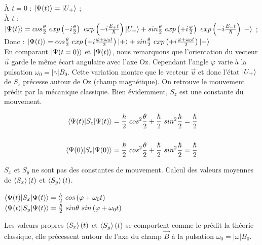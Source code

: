 \documentclass[12pt,a4paper,titlepage]{book}
\begin{document}
À $t=0$ : $\ket{\Psi (t)} = \ket{U_+}$ ;\\

À $t$ : $\ket{\Psi (t)} = cos \frac{\theta}{2} ~exp \left(-i \frac{\theta}{2} \right) ~exp \left(-i \frac{E_+ t}{\hbar} \right) \ket{U_+} + sin \frac{\theta}{2} ~exp \left(+i \frac{\varphi}{2} \right) ~exp \left(-i \frac{E_- t}{\hbar} \right) \ket-$ ;\\

Donc : $\ket{\Psi (t)} = cos \frac{\theta}{2} ~exp \left(+i \frac{\varphi + \omega_0 t}{2} \right) \ket+ + sin \frac{\theta}{2} ~exp \left(+i \frac{\varphi + \omega_0 t}{2} \right) \ket-$\\

En comparant $\ket{\Psi (t=0)}$ et $\ket{\Psi (t)}$, nous remarquons que l'orientation du vecteur $\overrightarrow{u}$ garde le même écart angulaire avec l'axe Oz. Cependant l'angle $\varphi$ varie à la pulsation $\omega_0 = \vert \gamma \vert B_0$. Cette variation montre que le vecteur $\overrightarrow{u}$ et donc l'état $\ket{U_+}$ de $S_z$ précesse autour de Oz (champ magnétique). On retrouve le mouvement prédit par la mécanique classique. Bien évidemment, $S_z$ est une constante du mouvement.

\begin{align*}
\braket{\Psi (t) | S_z | \Psi (t)} &= \frac{\hbar}{2} ~cos^2 \frac{\theta}{2} + \frac{\hbar}{2} ~sin^2 \frac{\hbar}{2} = \frac{\hbar}{2}\\
\\
\braket{\Psi(0) | S_z | \Psi(0)} &= \frac{\hbar}{2} ~cos^2 \frac{\theta}{2} + \frac{\hbar}{2} ~sin^2 \frac{\hbar}{2} = \frac{\hbar}{2}
\end{align*}

$S_x$ et $S_y$ ne sont pas des constantes de mouvement. Calcul des valeurs moyennes de $\braket{S_x}(t)$ et $\braket{S_y}(t)$.

\begin{center}
$\braket{\Psi (t) \vert S_x \vert \Psi (t)} = \frac{\hbar}{2} ~cos \left( \varphi + \omega_0 t \right)$\\
$\braket{\Psi (t) \vert S_y \vert \Psi (t)} = \frac{\hbar}{2} ~sin \theta ~sin \left( \varphi + \omega_0 t \right)$
\end{center}

Les valeurs propres $\braket{S_x} (t)$ et $\braket{S_y} (t)$ se comportent comme le prédit la théorie classique, elle précessent autour de l'axe du champ $\overrightarrow{B}$ à la pulsation $\omega_0 = \vert \omega \vert B_0$.
\end{document}
